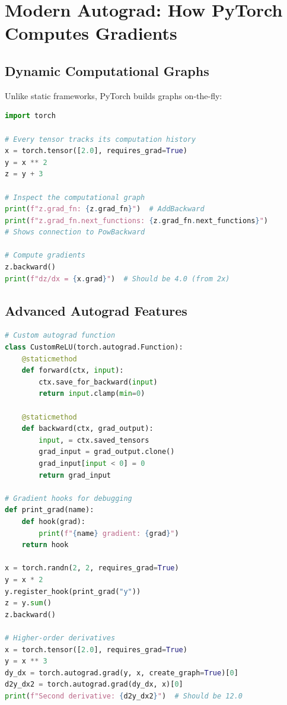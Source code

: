 \documentclass{article}
\begin{document}
\section{Modern Autograd: How PyTorch Computes Gradients}

\subsection{Dynamic Computational Graphs}

Unlike static frameworks, PyTorch builds graphs on-the-fly:

\begin{lstlisting}[language=Python, caption=PyTorch Autograd Internals]
import torch

# Every tensor tracks its computation history
x = torch.tensor([2.0], requires_grad=True)
y = x ** 2
z = y + 3

# Inspect the computational graph
print(f"z.grad_fn: {z.grad_fn}")  # AddBackward
print(f"z.grad_fn.next_functions: {z.grad_fn.next_functions}")
# Shows connection to PowBackward

# Compute gradients
z.backward()
print(f"dz/dx = {x.grad}")  # Should be 4.0 (from 2x)
\end{lstlisting}

\subsection{Advanced Autograd Features}

\begin{lstlisting}[language=Python, caption=Advanced PyTorch Autograd]
# Custom autograd function
class CustomReLU(torch.autograd.Function):
    @staticmethod
    def forward(ctx, input):
        ctx.save_for_backward(input)
        return input.clamp(min=0)
    
    @staticmethod
    def backward(ctx, grad_output):
        input, = ctx.saved_tensors
        grad_input = grad_output.clone()
        grad_input[input < 0] = 0
        return grad_input

# Gradient hooks for debugging
def print_grad(name):
    def hook(grad):
        print(f"{name} gradient: {grad}")
    return hook

x = torch.randn(2, 2, requires_grad=True)
y = x * 2
y.register_hook(print_grad("y"))
z = y.sum()
z.backward()

# Higher-order derivatives
x = torch.tensor([2.0], requires_grad=True)
y = x ** 3
dy_dx = torch.autograd.grad(y, x, create_graph=True)[0]
d2y_dx2 = torch.autograd.grad(dy_dx, x)[0]
print(f"Second derivative: {d2y_dx2}")  # Should be 12.0
\end{lstlisting}
\end{document}
